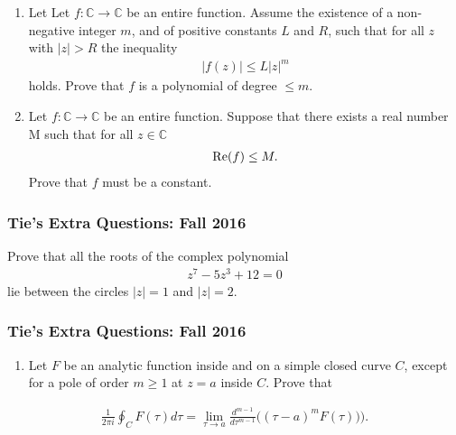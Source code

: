 \begin{enumerate}
\def\labelenumi{(\alph{enumi})}
\item
  Let Let \(f:{\mathbb C}\rightarrow {\mathbb C}\) be an entire
  function. Assume the existence of a non-negative integer \(m\), and of
  positive constants \(L\) and \(R\), such that for all \(z\) with
  \(|z|>R\) the inequality
  \begin{align*}|f(z)| \leq L |z|^m\end{align*}
  holds. Prove that \(f\) is a polynomial of degree \(\leq m\).
\item
  Let \(f:{\mathbb C}\rightarrow {\mathbb C}\) be an entire function.
  Suppose that there exists a real number M such that for all
  \(z\in {\mathbb C}\)
  \begin{align*}\mbox{\textrm Re} (f) \leq M.\end{align*}
  Prove that \(f\) must be a constant.
\end{enumerate}

\hypertarget{ties-extra-questions-fall-2016-4}{%
\subsubsection{Tie's Extra Questions: Fall
2016}\label{ties-extra-questions-fall-2016-4}}

Prove that all the roots of the complex polynomial
\begin{align*}z^7 - 5 z^3 +12 =0\end{align*}
lie between the circles \(|z|=1\) and \(|z|=2\).

\hypertarget{ties-extra-questions-fall-2016-5}{%
\subsubsection{Tie's Extra Questions: Fall
2016}\label{ties-extra-questions-fall-2016-5}}

\begin{enumerate}
\def\labelenumi{(\alph{enumi})}
\tightlist
\item
  Let \(F\) be an analytic function inside and on a simple closed curve
  \(C\), except for a pole of order \(m\geq 1\) at \(z=a\) inside \(C\).
  Prove that
\end{enumerate}

\begin{align*}\frac{1}{2 \pi i}\oint_{C} F(\tau) d\tau =
\lim_{\tau\rightarrow a} \frac{d^{m-1}}{d\tau^{m-1}}\big((\tau-a)^m F(\tau))\big).\end{align*}

